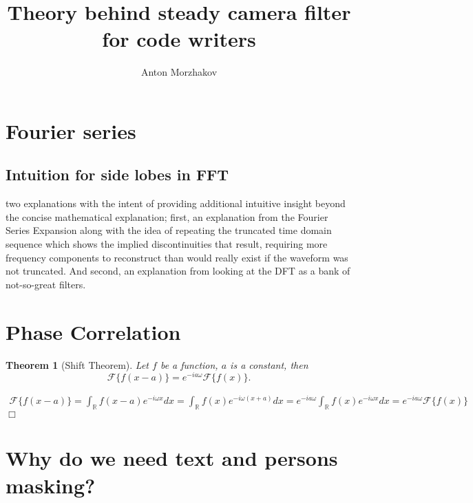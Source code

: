 \documentclass[9pt]{article}
\newtheorem{theorem}{Theorem}[section]
\newtheorem{proof}{Proof}
\renewenvironment{proof}{{\bf \emph{Proof.} }}{\hfill $\Box$ \\}
\numberwithin{equation}{section}
\begin{document}
\title{\sc Theory behind steady camera filter for code writers}
\author{Anton Morzhakov}
\maketitle

\section{Fourier series}\label{sec:theory-behind-fourier-series}


\subsection{Intuition for side lobes in FFT}
\label{subsec:intuition-for-sidelobes-in-fft}
two explanations with the intent of providing additional intuitive insight beyond the concise mathematical explanation;
first, an explanation from the Fourier Series Expansion along with the idea of repeating the truncated time domain
sequence which shows the implied discontinuities that result, requiring more frequency components to reconstruct than
would really exist if the waveform was not truncated.
And second, an explanation from looking at the DFT as a bank of not-so-great filters.



\section{Phase Correlation}\label{sec:theory-behind-phase-correlation}

        \begin{theorem}[Shift Theorem] \label{shift_theorem}
            Let \(f\) be a function, $a$ is a constant, then
            \[
                \mathcal F \{ f(x - a) \} =  e^{-i a \omega} \mathcal F \{ f(x) \}.
            \]
        \end{theorem}

        \begin{proof}
            \begin{multline}
                \mathcal F \{ f(x - a) \}  =  \int_{\mathbb R} f(x - a) e^{-i \omega x} dx =
                \int_{\mathbb R} f(x) e^{-i \omega (x + a)} dx = \allowbreak
                e^{-i a \omega} \int_{\mathbb R} f(x) e^{-i \omega x} dx = e^{-i a \omega} \mathcal F \{ f(x) \}
            \end{multline}
        \end{proof}

\section{Why do we need text and persons masking?}\label{sec:why-we-need-text-and-persond-masking?}
\end{document}
